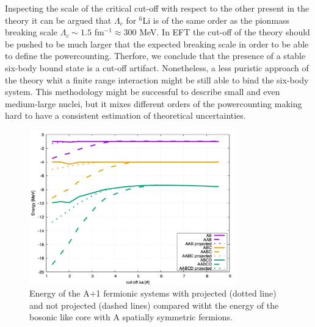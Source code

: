 \documentclass[preprint,12pt]{elsarticle}
\begin{document}
Inspecting the scale of the critical cut-off with respect to the other present in the theory it can be argued that $\Lambda_c$ for $^6$Li is of the same order  as the pionmass breaking scale $\Lambda_c\sim1.5$ fm$^{-1} \approx300$ MeV.
In EFT the cut-off of the theory should be pushed to be much larger that the expected breaking scale in order to be able to define the powercounting.
Therfore, we conclude that the presence of a stable six-body bound state is a cut-off artifact.
Nonetheless, a less puristic approach of the theory whit a finite range interaction might be still able to bind the six-body system. 
This methodology might be successful to describe small and even medium-large nuclei, but it mixes different orders of the powercounting making hard to have a consistent estimation of theoretical uncertainties.


\begin{figure}[h] 
\centering 
\includegraphics[width=0.8\textwidth]{./Sprojection} 
\caption{Energy of the A+1 fermionic systems with projected (dotted line) and not projected (dashed lines) compared witht the energy of the bosonic like core with A spatially symmetric fermions.}
\label{fig:Sprojection}
\end{figure} 
\end{document}
